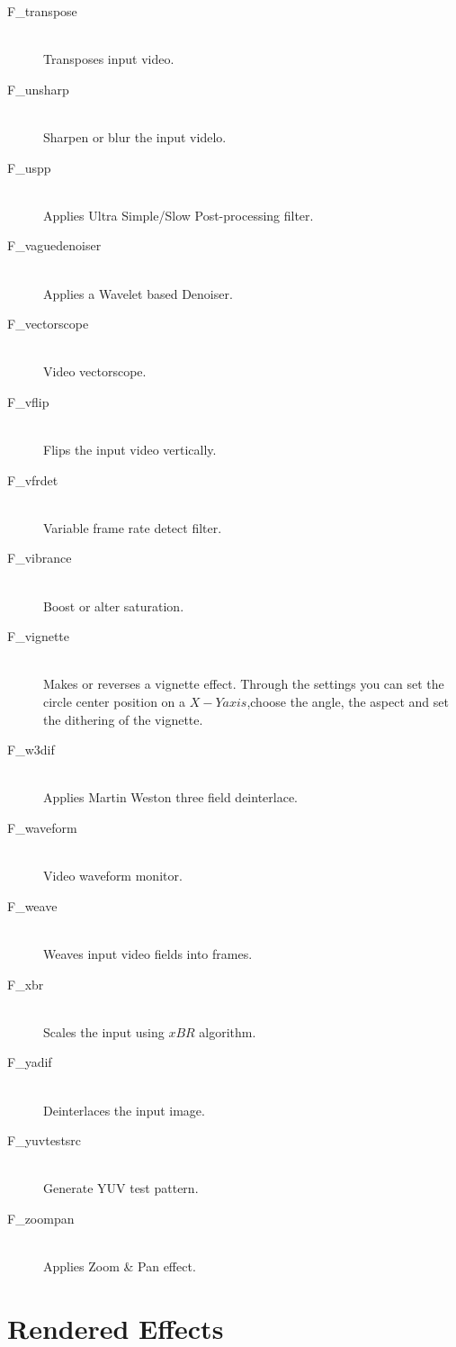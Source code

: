 \begin{description}
\item [F\_transpose]~\\Transposes input video.
\item [F\_unsharp]~\\Sharpen or blur the input videlo.
\item [F\_uspp]~\\Applies Ultra Simple/Slow Post-processing
  filter.
\item [F\_vaguedenoiser]~\\Applies a Wavelet based Denoiser.
\item [F\_vectorscope]~\\Video vectorscope.
\item [F\_vflip]~\\Flips the input video vertically.
\item [F\_vfrdet]~\\Variable frame rate detect filter.
\item [F\_vibrance]~\\Boost or alter saturation.
\item [F\_vignette]~\\Makes or reverses a vignette
  effect. Through the settings you can set the circle center position
  on a $X-Y axis$,choose the angle, the aspect and set the dithering
  of the vignette.
\item [F\_w3dif]~\\Applies Martin Weston three field
  deinterlace.
\item [F\_waveform]~\\Video waveform monitor.
\item [F\_weave]~\\Weaves input video fields into frames.
\item [F\_xbr]~\\Scales the input using $xBR$ algorithm.
\item [F\_yadif]~\\Deinterlaces the input image.
\item [F\_yuvtestsrc]~\\Generate YUV test pattern.
\item [F\_zoompan]~\\Applies Zoom \& Pan effect.
\end{description}


\section[Rendered Effects]{Rendered Effects}%
\label{sec:rendered_effects}

